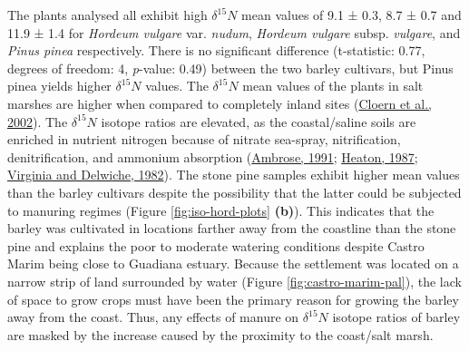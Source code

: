 \documentclass[3p]{elsarticle} %
\begin{document}
The plants analysed all exhibit high \(\delta ^{15}N\) mean values of 9.1 ± 0.3\text{\textperthousand}, 8.7 ± 0.7\text{\textperthousand} and 11.9 ± 1.4\text{\textperthousand} for \emph{Hordeum vulgare} var. \emph{nudum}, \emph{Hordeum vulgare} subsp. \emph{vulgare}, and \emph{Pinus pinea} respectively. There is no significant difference (t-statistic: 0.77, degrees of freedom: 4, \emph{p}-value: 0.49) between the two barley cultivars, but Pinus pinea yields higher \(\delta ^{15}N\) values. The \(\delta ^{15}N\) mean values of the plants in salt marshes are higher when compared to completely inland sites (\protect\hyperlink{ref-cloern_etal02}{Cloern et al., 2002}). The \(\delta ^{15}N\) isotope ratios are elevated, as the coastal/saline soils are enriched in nutrient nitrogen because of nitrate sea-spray, nitrification, denitrification, and ammonium absorption (\protect\hyperlink{ref-ambrose91}{Ambrose, 1991}; \protect\hyperlink{ref-heaton87}{Heaton, 1987}; \protect\hyperlink{ref-virginia_delwiche82}{Virginia and Delwiche, 1982}). The stone pine samples exhibit higher mean values than the barley cultivars despite the possibility that the latter could be subjected to manuring regimes (Figure \ref{fig:iso-hord-plots} \textbf{(b)}). This indicates that the barley was cultivated in locations farther away from the coastline than the stone pine and explains the poor to moderate watering conditions despite Castro Marim being close to Guadiana estuary. Because the settlement was located on a narrow strip of land surrounded by water (Figure \ref{fig:castro-marim-pal}), the lack of space to grow crops must have been the primary reason for growing the barley away from the coast. Thus, any effects of manure on \(\delta ^{15}N\) isotope ratios of barley are masked by the increase caused by the proximity to the coast/salt marsh.

\begingroup\fontsize{7.5}{9.5}\selectfont
\end{document}
